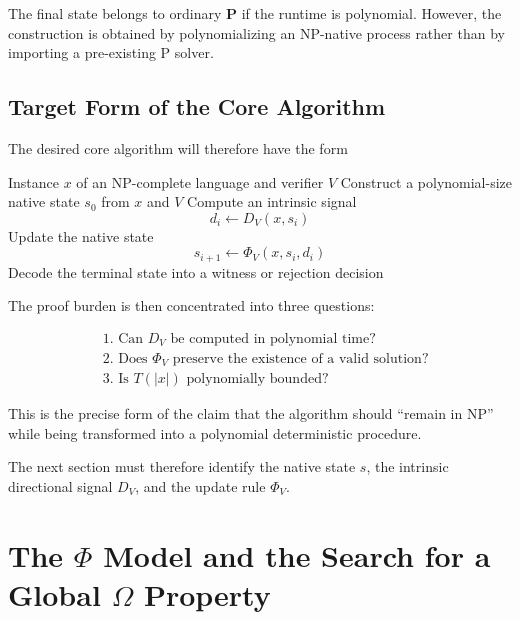 \documentclass[11pt]{article}
\theoremstyle{plain}
\theoremstyle{definition}
\begin{document}
The final state belongs to ordinary \(\mathbf{P}\) if the runtime is
polynomial.  However, the construction is obtained by polynomializing an
NP-native process rather than by importing a pre-existing P solver.

\subsection{Target Form of the Core Algorithm}

The desired core algorithm will therefore have the form

\begin{algorithm}
\caption{Abstract NP-Native Polynomialization}
\label{alg:np-native-template}
\begin{algorithmic}[1]
\Require Instance \(x\) of an NP-complete language and verifier \(V\)
\State Construct a polynomial-size native state \(s_0\) from \(x\) and \(V\)
    \State Compute an intrinsic signal
    \[
        d_i \gets D_V(x,s_i)
    \]
    \State Update the native state
    \[
        s_{i+1}\gets \Phi_V(x,s_i,d_i)
    \]
\EndFor
\State Decode the terminal state into a witness or rejection decision
\end{algorithmic}
\end{algorithm}

The proof burden is then concentrated into three questions:

\[
\boxed{
\begin{aligned}
&\text{1. Can }D_V\text{ be computed in polynomial time?}\\
&\text{2. Does }\Phi_V\text{ preserve the existence of a valid solution?}\\
&\text{3. Is }T(|x|)\text{ polynomially bounded?}
\end{aligned}
}
\]

This is the precise form of the claim that the algorithm should ``remain in
NP'' while being transformed into a polynomial deterministic procedure.

The next section must therefore identify the native state \(s\), the intrinsic
directional signal \(D_V\), and the update rule \(\Phi_V\).


\section{The \texorpdfstring{\(\Phi\)}{Phi} Model and the Search for a Global \texorpdfstring{\(\Omega\)}{Omega} Property}
\label{sec:phi-omega}
\end{document}
